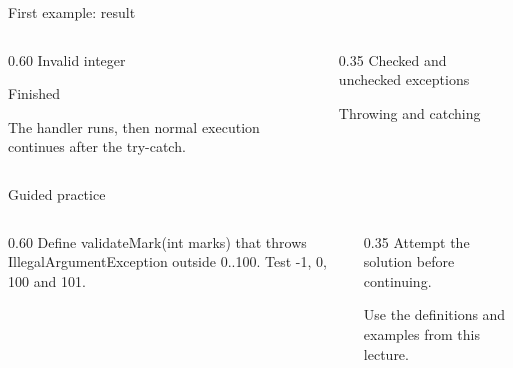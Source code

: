 \documentclass[10pt,aspectratio=169]{beamer}
\begin{document}
\begin{frame}[fragile,t]{First example: result}
\begin{columns}[T,onlytextwidth]\begin{column}{0.60\textwidth}
Invalid integer\par Finished\par The handler runs, then normal execution continues after the try-catch.
\end{column}\begin{column}{0.35\textwidth}\small
Checked and unchecked exceptions

Throwing and catching
\end{column}\end{columns}
\end{frame}

\begin{frame}[fragile,t]{Guided practice}
\begin{columns}[T,onlytextwidth]\begin{column}{0.60\textwidth}
Define validateMark(int marks) that throws IllegalArgumentException outside 0..100. Test -1, 0, 100 and 101.
\end{column}\begin{column}{0.35\textwidth}\small
Attempt the solution before continuing.

Use the definitions and examples from this lecture.
\end{column}\end{columns}
\end{frame}
\end{document}
